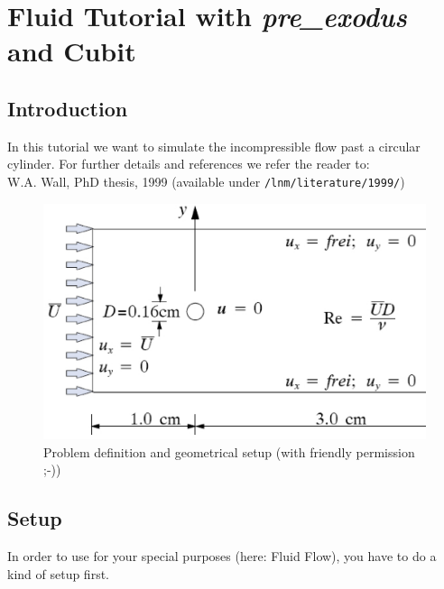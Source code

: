 
\newcommand{\prexo}{\emph{pre\_exodus \,}}
\newcommand{\bc}{\emph{bc-file \,}}
\newcommand{\head}{\emph{header-file \,}}

\chapter{Fluid Tutorial with \prexo and Cubit}
\label{tut_fluid_preexo:chap}

\section{Introduction}
In this tutorial we want to simulate the incompressible flow past a circular cylinder.
For further details and references we refer the reader to:\\
W.A. Wall, PhD thesis, 1999
(available under \texttt{/lnm/literature/1999/})
\begin{figure}[h]
\begin{center}
 \includegraphics[scale=0.35]{pics/tut_fluid_problem}
 \caption{Problem definition and geometrical setup (with friendly permission ;-))}
\label{fig:tut_fluid_preexo_setup}
\end{center}
\end{figure}

\section{\baci{} Setup}

In order to use \baci{} for your special purposes (here: Fluid Flow), you have
to do a kind of setup first. 

